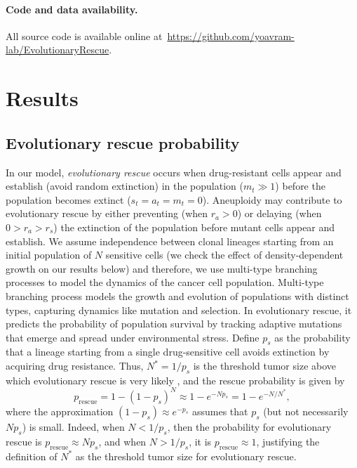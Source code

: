\documentclass[12pt]{extarticle}
\newcommand{\e}{e}
\newcommand{\presc}{p_\text{rescue}}
\renewcommand{\Delta}{r}
\begin{document}

\paragraph{Code and data availability.} All source code is available online at~\url{https://github.com/yoavram-lab/EvolutionaryRescue}.


\section*{Results}


\subsection*{Evolutionary rescue probability}

In our model, \emph{evolutionary rescue} occurs when drug-resistant cells appear and establish (avoid random extinction) in the population  ($m_t \gg 1$) before the population becomes extinct ($s_t=a_t=m_t=0$). %
Aneuploidy may contribute to evolutionary rescue by either preventing (when $\Delta_a>0$) or delaying (when $0>\Delta_a>\Delta_s$) the extinction of the population before mutant cells appear and establish.
We assume independence between clonal lineages starting from an initial population of $N$ sensitive cells (we check the effect of density-dependent growth on our results below) and therefore, we use multi-type branching processes to model the dynamics of the cancer cell population. Multi-type branching process models the growth and evolution of populations with distinct types, capturing dynamics like mutation and selection. In evolutionary rescue, it predicts the probability of population survival by tracking adaptive mutations that emerge and spread under environmental stress. %
Define $p_s$ as the probability that a lineage starting from a single drug-sensitive cell avoids extinction by acquiring drug resistance.
Thus, $N^*=1/p_s$ is the threshold tumor size above which evolutionary rescue is very likely \citep{iwasa2003evolutionary}, and the rescue probability is given by 
\begin{equation}\label{eq:rescue_prob} 
\presc = 
1-\left(1-p_s\right)^N \approx
1-\e^{-Np_s} = 
1-e^{-N/N^*} ,
\end{equation}
where the approximation $(1-p_s)\approx e^{-p_s}$ assumes that $p_s$ (but not necessarily $N p_s$) is small.
Indeed, when $N<1/p_s$, then the probability for evolutionary rescue is $\presc \approx N p_s$, and when $N > 1/p_s$, it is $\presc \approx 1$, justifying the definition of $N^*$ as the threshold tumor size for evolutionary rescue. 
\end{document}

